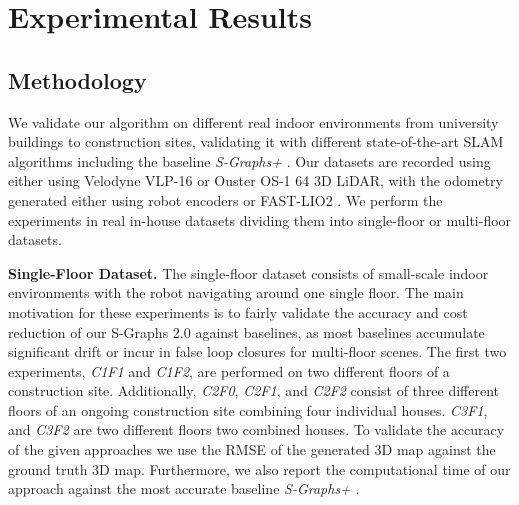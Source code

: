 \section{Experimental Results}

\subsection{Methodology}

We validate our algorithm on different real indoor environments from university buildings to construction sites, validating it with different state-of-the-art SLAM algorithms including the baseline \textit{S-Graphs+} \cite{s_graphs+}. Our datasets are recorded using either using Velodyne VLP-16 or Ouster OS-1 64 3D LiDAR, with the odometry generated either using robot encoders or FAST-LIO2 \cite{fast_lio2}. We perform the experiments in real in-house datasets dividing them into single-floor or multi-floor datasets.   

\textbf{Single-Floor Dataset.} 
The single-floor dataset consists of small-scale indoor environments with the robot navigating around one single floor. The main motivation for these experiments is to fairly validate the accuracy and cost reduction of our S-Graphs 2.0 against baselines, as most baselines accumulate significant drift or incur in false loop closures for multi-floor scenes. The first two experiments, \textit{C1F1} and \textit{C1F2}, are performed on two different floors of a construction site. Additionally, \textit{C2F0}, \textit{C2F1}, and \textit{C2F2} consist of three different floors of an ongoing construction site combining four individual houses. \textit{C3F1}, and \textit{C3F2} are two different floors two combined houses. To validate the accuracy of the given approaches we use the RMSE of the generated 3D map against the ground truth 3D map. Furthermore, we also report the computational time of our approach against the most accurate baseline \textit{S-Graphs+} \cite{s_graphs+}. 


